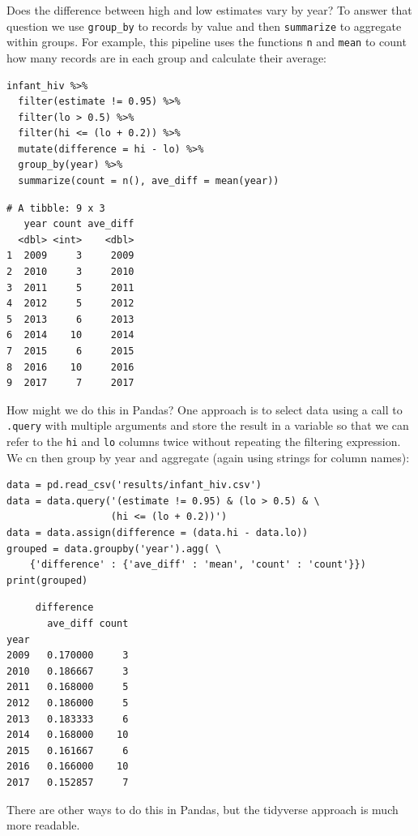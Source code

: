 Does the difference between high and low estimates vary by year?
To answer that question we use \texttt{group\_by} to  records by value
and then \texttt{summarize} to aggregate within groups.
For example,
this pipeline uses the functions \texttt{n} and \texttt{mean}
to count how many records are in each group
and calculate their average:

\begin{lstlisting}
infant_hiv %>%
  filter(estimate != 0.95) %>%
  filter(lo > 0.5) %>%
  filter(hi <= (lo + 0.2)) %>%
  mutate(difference = hi - lo) %>%
  group_by(year) %>%
  summarize(count = n(), ave_diff = mean(year))
\end{lstlisting}

\begin{lstlisting}
# A tibble: 9 x 3
   year count ave_diff
  <dbl> <int>    <dbl>
1  2009     3     2009
2  2010     3     2010
3  2011     5     2011
4  2012     5     2012
5  2013     6     2013
6  2014    10     2014
7  2015     6     2015
8  2016    10     2016
9  2017     7     2017
\end{lstlisting}

How might we do this in Pandas?
One approach is to select data using a call to \texttt{.query} with multiple arguments
and store the result in a variable
so that we can refer to the \texttt{hi} and \texttt{lo} columns twice
without repeating the filtering expression.
We cn then group by year and aggregate
(again using strings for column names):

\begin{lstlisting}
data = pd.read_csv('results/infant_hiv.csv')
data = data.query('(estimate != 0.95) & (lo > 0.5) & \
                  (hi <= (lo + 0.2))')
data = data.assign(difference = (data.hi - data.lo))
grouped = data.groupby('year').agg( \
    {'difference' : {'ave_diff' : 'mean', 'count' : 'count'}})
print(grouped)
\end{lstlisting}

\begin{lstlisting}
     difference      
       ave_diff count
year                 
2009   0.170000     3
2010   0.186667     3
2011   0.168000     5
2012   0.186000     5
2013   0.183333     6
2014   0.168000    10
2015   0.161667     6
2016   0.166000    10
2017   0.152857     7
\end{lstlisting}

\noindent
There are other ways to do this in Pandas,
but the tidyverse approach is much more readable.

